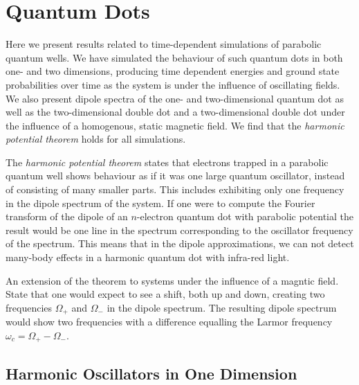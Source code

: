 \chapter{Quantum Dots}

Here we present results related to time-dependent simulations of parabolic quantum
wells. We have simulated the behaviour of such quantum dots in both one- and two 
dimensions, producing time dependent energies and ground state probabilities over
time as the system is under the influence of oscillating fields. We also present 
dipole spectra of the one- and two-dimensional quantum dot as well as the 
two-dimensional double dot and a two-dimensional double dot under the influence of
a homogenous, static magnetic field. We find that the \emph{harmonic potential theorem}
holds for all simulations.

The \emph{harmonic potential theorem}\cite{kohn1961cyclotron}
states that electrons trapped in a parabolic quantum well shows behaviour as if it 
was one large quantum oscillator, instead of consisting of many smaller parts. This 
includes exhibiting only one frequency in the dipole spectrum of the system. If one 
were to compute the Fourier transform of the dipole of an $n$-electron quantum dot with 
parabolic potential the result would be one line in the spectrum corresponding to the
oscillator frequency of the spectrum. This means that in the dipole approximations,
 we can not detect many-body effects in a harmonic quantum dot with infra-red light.

An extension of the theorem to systems under the influence 
of a magntic field\cite{brey1989optical}. State that one would expect to see a shift,
both up and down, creating two frequencies $\Omega_+$ and $\Omega_-$ in the dipole 
spectrum. The resulting dipole spectrum would show two frequencies with a difference 
equalling the Larmor frequency $\omega_c = \Omega_+ - \Omega_-$.

\section{Harmonic Oscillators in One Dimension}


